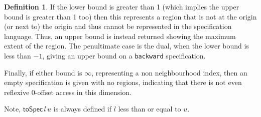 \documentclass[9pt]{sigplanconf}
\newcounter{block}
\theoremstyle{definition}
\newtheorem{definition}[block]{Definition}
\begin{document}
\begin{definition}
If the lower bound is greater than 1
(which implies the upper bound is greater than 1 too) then
this represents a region that is not at the origin (or next to) the
origin and thus cannot be represented in the specification language.
Thus, an upper bound is instead returned showing the maximum extent
of the region. The penultimate case is the dual, when the lower bound is less
than $-1$, giving an upper bound on a \texttt{backward} specification.

Finally, if either bound is $\infty$, representing a non
neighbourhood index, then an empty specification is given
 with no regions, indicating that there is not even reflexive
0-offset access in this dimension.

Note, $\mathsf{toSpec} \, l \, u$ is always defined 
 if $l$ less than or equal to $u$. 
\end{definition}
\end{document}
